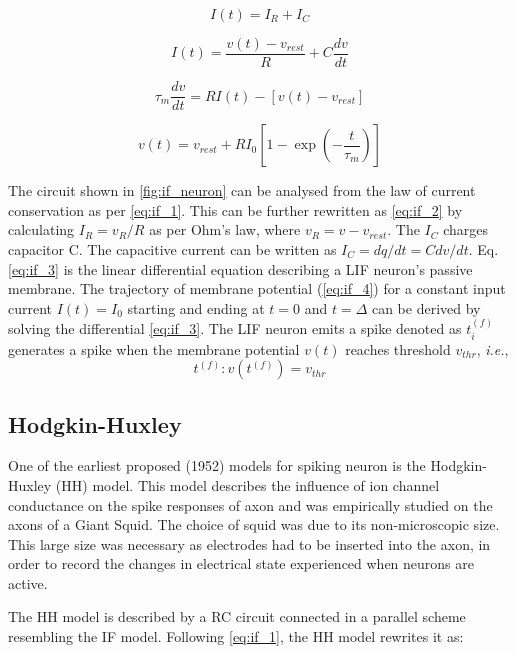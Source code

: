 \begin{equation}
	I(t)=I_R+I_C
	\label{eq:if_1}
\end{equation}

\begin{equation}
	I(t)=\frac{v(t)-v_{rest}}{R}+C \frac{dv}{dt}
	\label{eq:if_2}
\end{equation}

\begin{equation}
\tau_m\frac{dv}{dt}=RI(t)-[v(t)-v_{rest}]
\label{eq:if_3}
\end{equation}

\begin{equation}
v(t)=v_{rest}+RI_0[1-\exp(-\frac{t}{\tau_m})]
\label{eq:if_4}
\end{equation}


The circuit shown in \figurename \ref{fig:if_neuron} can be analysed from the law of current conservation as per \equationname \ref{eq:if_1}. This can be further rewritten as \equationname \ref{eq:if_2} by calculating $\displaystyle I_R=v_R/R$ as per Ohm's law, where $v_R=v-v_{rest}$. The $I_C$ charges capacitor C. The capacitive current can be written as $I_C=dq/dt=Cdv/dt$. Eq. \equationname \ref{eq:if_3} is the linear differential equation describing a LIF neuron's passive membrane. The trajectory of membrane potential (\equationname \ref{eq:if_4}) for a constant input current $I(t)=I_0$ starting and ending at $t=0$ and $t=\Delta$ can be derived by solving the differential \equationname \ref{eq:if_3}. The LIF neuron emits a spike denoted as $t_i^{(f)}$ generates a spike when the membrane potential $v(t)$ reaches threshold $v_{thr}$, \emph{i.e.},
\begin{equation}
	t^{(f)}: v(t^{(f)})=v_{thr}
\end{equation}

\subsection{Hodgkin-Huxley}
One of the earliest proposed (1952) models for spiking neuron is the Hodgkin-Huxley (HH) model. This model describes the influence of ion channel conductance on the spike responses of axon and was empirically studied on the axons of a Giant Squid. The choice of squid was due to its non-microscopic size. This large size was necessary as electrodes had to be inserted into the axon, in order to record the changes in electrical state experienced when neurons are active.

The HH model is described by a RC circuit connected in a parallel scheme resembling the IF model. Following \equationname \ref{eq:if_1}, the HH model rewrites it as:

